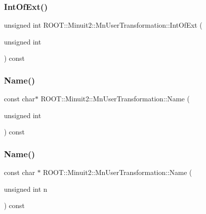 \subsubsection{\texorpdfstring{IntOfExt()}{IntOfExt()}\hspace{0.1cm}{\footnotesize\ttfamily [2/2]}}
{\footnotesize\ttfamily unsigned int R\+O\+O\+T\+::\+Minuit2\+::\+Mn\+User\+Transformation\+::\+Int\+Of\+Ext (\begin{DoxyParamCaption}\item[{unsigned int}]{ }\end{DoxyParamCaption}) const}

\mbox{\label{classROOT_1_1Minuit2_1_1MnUserTransformation_aabd7adf5448aa905598b93a6d633e0ac}} 
\subsubsection{\texorpdfstring{Name()}{Name()}\hspace{0.1cm}{\footnotesize\ttfamily [1/2]}}
{\footnotesize\ttfamily const char$\ast$ R\+O\+O\+T\+::\+Minuit2\+::\+Mn\+User\+Transformation\+::\+Name (\begin{DoxyParamCaption}\item[{unsigned int}]{ }\end{DoxyParamCaption}) const}

\mbox{\label{classROOT_1_1Minuit2_1_1MnUserTransformation_a83b4e1b3d5b020b4151d5dc30ff5488a}} 
\subsubsection{\texorpdfstring{Name()}{Name()}\hspace{0.1cm}{\footnotesize\ttfamily [2/2]}}
{\footnotesize\ttfamily const char $\ast$ R\+O\+O\+T\+::\+Minuit2\+::\+Mn\+User\+Transformation\+::\+Name (\begin{DoxyParamCaption}\item[{unsigned int}]{n }\end{DoxyParamCaption}) const}

